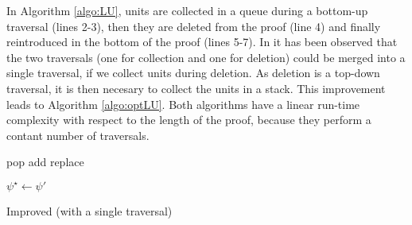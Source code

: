 In Algorithm \ref{algo:LU}, units are collected in a queue
during a bottom-up traversal (lines 2-3), then they are deleted from the proof (line 4) and finally reintroduced in the bottom of the proof (lines 5-7). In \cite{Boudou} it has been observed that the two traversals (one for collection and one for deletion) could be merged into a single traversal, if we collect units during deletion. As deletion is a top-down traversal, it is then necesary to collect the units in a stack. This improvement leads to Algorithm \ref{algo:optLU}. Both algorithms have a linear run-time complexity with respect to the length of the proof, because they perform a contant number of traversals.


\begin{algorithm}[pbt]
  \SetAlgoVlined
  \SetAlgoShortEnd

  \BlankLine

   {pop}
   {add}
   {replace}

  \BlankLine

  \BlankLine


  $\psi^{\star} \leftarrow \psi'$ \;

  \caption{Improved {\LowerUnits} (with a single traversal)}
  \label{algo:optLU}
\end{algorithm}



\clearpage
